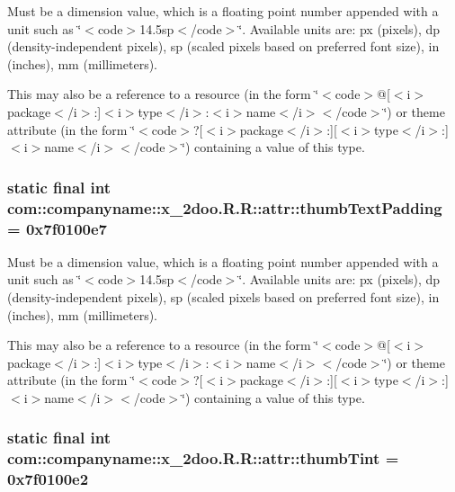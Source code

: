 Must be a dimension value, which is a floating point number appended with a unit such as \char`\"{}$<$code$>$14.5sp$<$/code$>$\char`\"{}. Available units are: px (pixels), dp (density-independent pixels), sp (scaled pixels based on preferred font size), in (inches), mm (millimeters). 

This may also be a reference to a resource (in the form \char`\"{}$<$code$>$@\mbox{[}$<$i$>$package$<$/i$>$:\mbox{]}$<$i$>$type$<$/i$>$:$<$i$>$name$<$/i$>$$<$/code$>$\char`\"{}) or theme attribute (in the form \char`\"{}$<$code$>$?\mbox{[}$<$i$>$package$<$/i$>$:\mbox{]}\mbox{[}$<$i$>$type$<$/i$>$:\mbox{]}$<$i$>$name$<$/i$>$$<$/code$>$\char`\"{}) containing a value of this type. \hypertarget{classcom_1_1companyname_1_1x__2doo_1_1_r_1_1attr_319bea80a72e815d2f7105ebe93e1ac0}{
\subsubsection[{thumbTextPadding}]{\setlength{\rightskip}{0pt plus 5cm}static final int com::companyname::x\_\-2doo.R.R::attr::thumbTextPadding = 0x7f0100e7}}
\label{classcom_1_1companyname_1_1x__2doo_1_1_r_1_1attr_319bea80a72e815d2f7105ebe93e1ac0}


Must be a dimension value, which is a floating point number appended with a unit such as \char`\"{}$<$code$>$14.5sp$<$/code$>$\char`\"{}. Available units are: px (pixels), dp (density-independent pixels), sp (scaled pixels based on preferred font size), in (inches), mm (millimeters). 

This may also be a reference to a resource (in the form \char`\"{}$<$code$>$@\mbox{[}$<$i$>$package$<$/i$>$:\mbox{]}$<$i$>$type$<$/i$>$:$<$i$>$name$<$/i$>$$<$/code$>$\char`\"{}) or theme attribute (in the form \char`\"{}$<$code$>$?\mbox{[}$<$i$>$package$<$/i$>$:\mbox{]}\mbox{[}$<$i$>$type$<$/i$>$:\mbox{]}$<$i$>$name$<$/i$>$$<$/code$>$\char`\"{}) containing a value of this type. \hypertarget{classcom_1_1companyname_1_1x__2doo_1_1_r_1_1attr_5ff50a30d9f3d2beb618a6e0700b7ab7}{
\subsubsection[{thumbTint}]{\setlength{\rightskip}{0pt plus 5cm}static final int com::companyname::x\_\-2doo.R.R::attr::thumbTint = 0x7f0100e2}}
\label{classcom_1_1companyname_1_1x__2doo_1_1_r_1_1attr_5ff50a30d9f3d2beb618a6e0700b7ab7}


